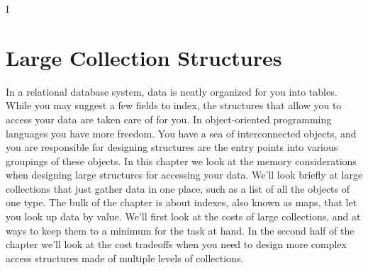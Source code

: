 I\chapter{Large Collection Structures}
\label{chapter:tables-indexes}

In a relational database system, data is neatly organized for you into tables.
While you may suggest a few fields to index, the structures that
allow you to access your data are taken care of for you.   In object-oriented
programming languages you have more freedom. You have a sea of interconnected
objects, and you are responsible for designing structures are the entry points into various 
groupings of these objects.
In this chapter we look at the memory considerations when
designing large structures for accessing your
data. We'll
look briefly at large collections that just gather data in one place, such as a
list of all the objects of one type. The bulk of the chapter is about
indexes, also known as maps, that let you look up data by value. We'll first look at the costs of large collections,
and at ways to keep them to a minimum for the task at hand. In the second half
of the chapter we'll look at the cost tradeoffs when you need to
design more complex access structures made of multiple levels of collections.  












